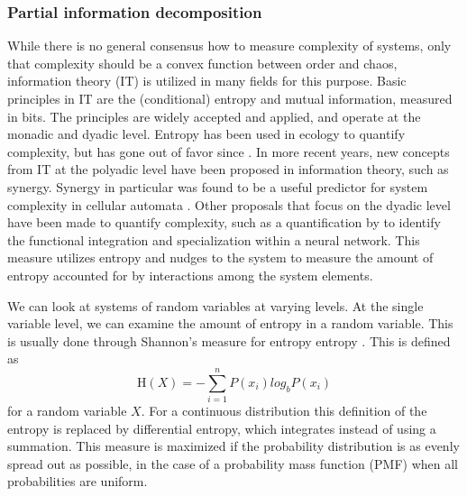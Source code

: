 \documentclass[../main.tex]{subfiles}
\begin{document}
\subsubsection{Partial information decomposition}

While there is no general consensus how to measure complexity of systems, only that complexity should be a convex function between order and chaos, information theory (IT) is utilized in many fields for this purpose\cite{williams2010nonnegative, bar2013computationally}. %
Basic principles in IT are the (conditional) entropy and mutual information, measured in bits.
The principles are widely accepted and applied, and operate at the monadic and dyadic level.
Entropy has been used in ecology to quantify complexity, but has gone out of favor since \cite{ulanowicz2001information}.
In more recent years, new concepts from IT at the polyadic level have been proposed in information theory, such as synergy.
Synergy in particular was found to be a useful predictor for system complexity in cellular automata \cite{9999QuaxChli}.
Other proposals that focus on the dyadic level have been made to quantify complexity, such as a quantification by \cite{tononi1999measures} to identify the functional integration and specialization within a neural network.
This measure utilizes entropy and nudges to the system to measure the amount of entropy accounted for by interactions among the system elements.


We can look at systems of random variables at varying levels.
At the single variable level, we can examine the amount of entropy in a random variable.
This is usually done through Shannon's measure for entropy entropy \cite{shannon1949mathematical}.
This is defined as 
%
\begin{equation}
\mathrm{H}(X) = -\sum^n_{i=1} P(x_i) log_b P(x_i)
\end{equation}
%
for a random variable $X$.
For a continuous distribution this definition of the entropy is replaced by differential entropy, which integrates instead of using a summation.
This measure is maximized if the probability distribution is as evenly spread out as possible, in the case of a probability mass function (PMF) when all probabilities are uniform.
\end{document}
